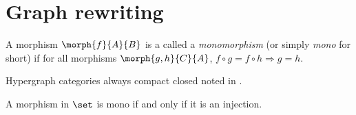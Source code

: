 \chapter{Graph rewriting}


\begin{definition}[Monomorphism]
    A morphism \(\morph{f}{A}{B}\) is a called a \emph{monomorphism} (or simply
    \emph{mono} for short) if for all morphisms \(\morph{g,h}{C}{A}\), \(
        f \circ g = f \circ h \Rightarrow g = h
    \).
\end{definition}

Hypergraph categories always compact closed noted in \cite{carboni1987cartesian}.

\begin{example}
    A morphism in \(\set\) is mono if and only if it is an injection.
\end{example}